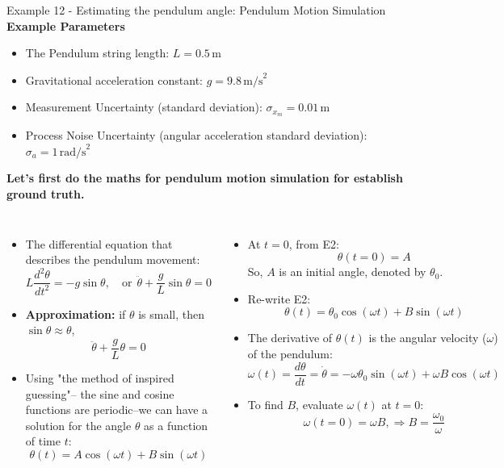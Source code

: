 \begin{frame}{Example 12 - Estimating the pendulum angle: Pendulum Motion Simulation}
\textbf{Example Parameters}
\begin{itemize}
    \item The Pendulum string length: \( L = 0.5\,\text{m} \)
    \item Gravitational acceleration constant: \( g = 9.8\,\text{m/s}^2 \)
    \item Measurement Uncertainty (standard deviation): \( \sigma_{x_m} = 0.01\,\text{m} \)
    \item Process Noise Uncertainty (angular acceleration standard deviation): \( \sigma_a = 1\,\text{rad/s}^2 \)
\end{itemize}
\textbf{Let's first do the maths for pendulum motion simulation for establish ground truth. }  
\begin{columns}
\begin{itemize}
    \item The differential equation that describes the pendulum movement:
    $$L\frac{d^2\theta}{dt^2} = -g\sin{\theta}, \quad \text{or}~~\ddot{\theta} + \frac{g}{L} \sin\theta = 0$$
    \item \textbf{Approximation:} if $\theta$ is small, then $\sin\theta \approx \theta$, 
\[
\ddot{\theta} + \frac{g}{L} \theta = 0 \tag{E1}
\] 

\item Using "the method of inspired guessing"-- the sine and cosine functions are periodic--we can have a solution for the angle $\theta$ as a function of time $t$:
\[
\theta(t) = A \cos(\omega t) + B \sin(\omega t) \tag{E2}
\]
\end{itemize}
\begin{itemize}
\item At $t = 0$, from E2:
\[
\theta(t = 0) = A
\]
So, $A$ is an initial angle, denoted by $\theta_0$.

\item Re-write E2:
\[
\theta(t) = \theta_0 \cos(\omega t) + B \sin(\omega t)
\]
\item The derivative of $\theta(t)$ is the angular velocity ($\omega$) of the pendulum:
\[
\omega(t) = \frac{d\theta}{dt} = \dot{\theta} = -\omega \theta_0 \sin(\omega t) + \omega B \cos(\omega t)
\]
\item To find $B$, evaluate $\omega(t)$ at $t = 0$:
\vspace{-5pt}
\[
\omega(t = 0) = \omega B, \Rightarrow B = \frac{\omega_0}{\omega}
\]
\end{itemize}
\end{columns}
\end{frame}


